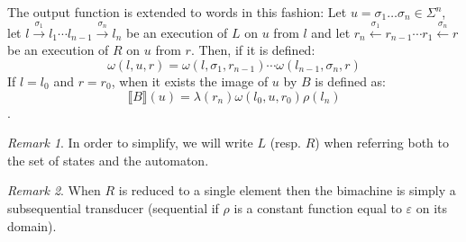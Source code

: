 \documentclass[12pt]{report}
\theoremstyle{definition}
\theoremstyle{remark}
\newtheorem{rmk}{Remark}[section]
\begin{document}
The output function is extended to words in this fashion:
Let $u=\sigma_1\ldots\sigma_n \in \Sigma^n$, let $l\xrightarrow{\sigma_1}l_1\cdots l_{n-1}\xrightarrow{\sigma_n} l_n$ be an execution of $L$ on $u$ from $l$ and let $r_n\xleftarrow{\sigma_1}r_{n-1}\cdots r_1\xleftarrow{\sigma_n} r$ be an execution of $R$ on $u$ from $r$. Then, if it is defined:
$$\omega(l,u,r)=\omega(l,\sigma_1,r_{n-1})\cdots\omega(l_{n-1},\sigma_n,r)$$
If $l=l_0$ and $r=r_0$, when it exists the image of $u$ by $B$ is defined as:
$$\llbracket B \rrbracket(u)=\lambda(r_n)\omega(l_0,u,r_0)\rho(l_n)$$.

\begin{rmk}
In order to simplify, we will write $L$ (resp. $R$) when referring both to the set of states and the automaton.
\end{rmk}
\begin{rmk}
When $R$ is reduced to a single element then the bimachine is simply a subsequential transducer (sequential if $\rho$ is a constant function equal to $\varepsilon$ on its domain).
\end{rmk}
\end{document}
